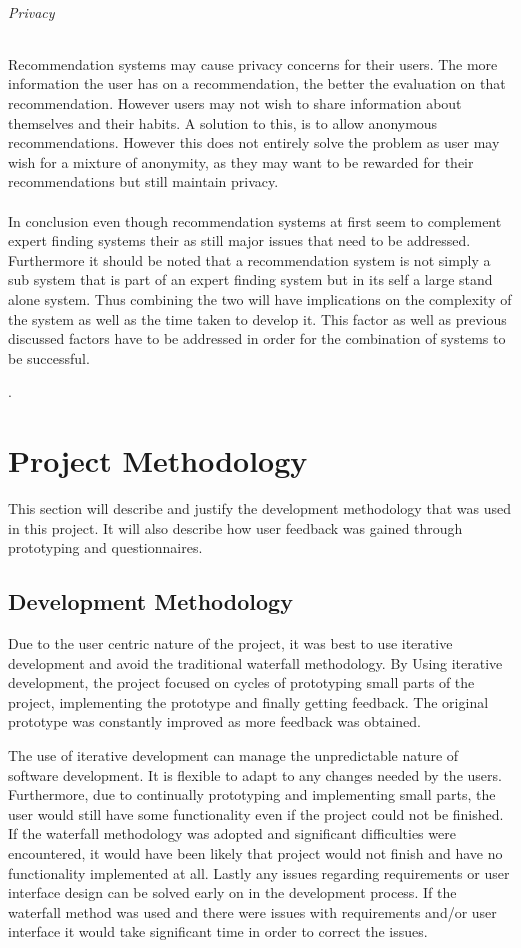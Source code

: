 \documentclass[a4paper,oneside,11pt]{report}
\begin{document}
\subparagraph{Privacy}
Recommendation systems may cause privacy concerns for their users. The more information the user has on a recommendation, the better the evaluation on that recommendation. However users may not wish to share information about themselves and their habits. A solution to this, is to allow anonymous recommendations. However this does not entirely solve the problem as user may wish for a mixture of anonymity, as they may want to be rewarded for their recommendations but still maintain privacy. 
\\
\\
In conclusion even though recommendation systems at first seem to complement expert finding systems their as still major issues that need to be addressed. Furthermore it should be noted that a recommendation system is not simply a sub system that is part of an expert finding system but in its self a large stand alone system. Thus combining the two will have implications on the complexity of the system as well as the time taken to develop it. This factor as well as previous discussed factors have to be addressed in order for the combination of systems to be successful.

. 


\chapter{Project Methodology}
This section will describe and justify the development methodology that was used in this project. It will also describe how user feedback was gained through prototyping and questionnaires.

\section{Development Methodology} 
Due to the user centric nature of the project, it was best to use iterative development and avoid the traditional waterfall methodology. By Using iterative development, the project focused on cycles of prototyping small parts of the project, implementing the prototype and finally getting feedback. The original prototype was constantly improved as more feedback was obtained.

The use of iterative development can manage the unpredictable nature of software development. It is flexible to adapt to any changes needed by the users. Furthermore, due to continually prototyping and implementing small parts, the user would still have some functionality even if the project could not be finished. If the waterfall methodology was adopted and significant difficulties were encountered, it would have been likely that project would not finish and have no functionality implemented at all. 
Lastly any issues regarding requirements or user interface design can be solved early on in the development process. If the waterfall method was used and there were issues with requirements and/or user interface it would take significant time in order to correct the issues.
\end{document}
